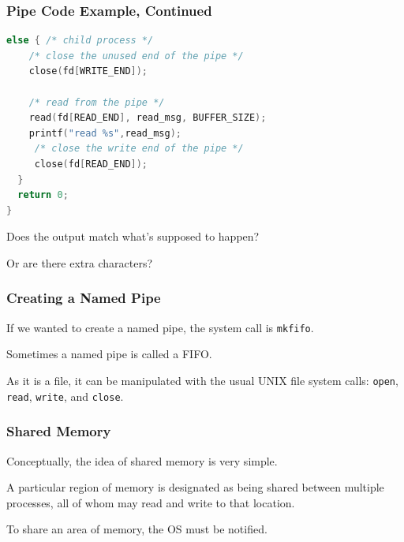 \begin{frame}[fragile]
\frametitle{Pipe Code Example, Continued}


\begin{lstlisting}[language=C]
  else { /* child process */
    /* close the unused end of the pipe */ 
    close(fd[WRITE_END]);
    
    /* read from the pipe */
    read(fd[READ_END], read_msg, BUFFER_SIZE); 
    printf("read %s",read_msg);
     /* close the write end of the pipe */
     close(fd[READ_END]); 
  }
  return 0;
}
\end{lstlisting}

Does the output match what's supposed to happen? 

Or are there extra characters?

\end{frame}

\begin{frame}
\frametitle{Creating a Named Pipe}

If we wanted to create a named pipe, the system call is \texttt{mkfifo}. 

Sometimes a named pipe is called a FIFO. 

As it is a file, it can be manipulated with the usual UNIX file system calls: \texttt{open}, \texttt{read}, \texttt{write}, and \texttt{close}.

\end{frame}


\begin{frame}
\frametitle{Shared Memory}

Conceptually, the idea of shared memory is very simple. 

A particular region of memory is designated as being shared between multiple processes, all of whom may read and write to that location. 

To share an area of memory, the OS must be notified.

\end{frame}


